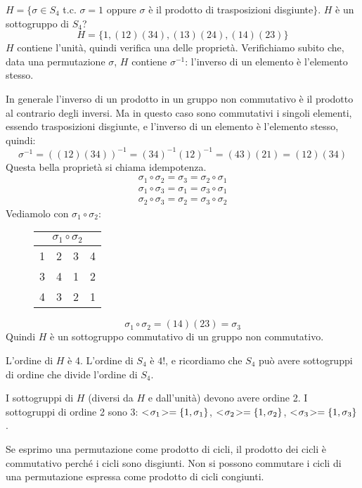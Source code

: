 \begin{exmp}
$H = \{ \sigma \in S_4$ t.c. $\sigma = 1$ oppure $\sigma$ \`e il prodotto di trasposizioni disgiunte$ \}$. $H$ \`e un sottogruppo di $S_4$?
\[
H = \{ 1, (1 2) (3 4), (1 3) (2 4), (1 4) (2 3) \}
\]
$H$ contiene l'unit\`a, quindi verifica una delle propriet\`a. Verifichiamo subito che, data una permutazione $\sigma$, $H$ contiene $\sigma^{-1}$: l'inverso di un elemento \`e l'elemento stesso.

In generale l'inverso di un prodotto in un gruppo non commutativo \`e il prodotto al contrario degli inversi. Ma in questo caso sono commutativi i singoli elementi, essendo trasposizioni disgiunte, e l'inverso di un elemento \`e l'elemento stesso, quindi:
\[
\sigma^{-1} = \left( (1 2) (3 4) \right)^{-1} = (3 4)^{-1} (1 2)^{-1} = (4 3) (2 1) = (1 2) (3 4)
\]
Questa bella propriet\`a si chiama idempotenza.
\begin{gather*}
\sigma_1 \circ \sigma_2 = \sigma_3 = \sigma_2 \circ \sigma_1 \\
\sigma_1 \circ \sigma_3 = \sigma_1 = \sigma_3 \circ \sigma_1 \\
\sigma_2 \circ \sigma_3 = \sigma_2 = \sigma_3 \circ \sigma_2
\end{gather*}
Vediamolo con $\sigma_1 \circ \sigma_2$:
\begin{figure}
\centering
\begin{tabular}{*{4}{c}}
\multicolumn{4}{c}{$\sigma_1 \circ \sigma_2$} \\
\hline
1 & 2 & 3 & 4 \\
3 & 4 & 1 & 2 \\
4 & 3 & 2 & 1
\end{tabular}
\end{figure}
\[
\sigma_1 \circ \sigma_2 = (1 4) (2 3) = \sigma_3
\]
Quindi $H$ \`e un sottogruppo commutativo di un gruppo non commutativo.

L'ordine di $H$ \`e 4. L'ordine di $S_4$ \`e $4!$, e ricordiamo che $S_4$ pu\`o avere sottogruppi di ordine che divide l'ordine di $S_4$.

I sottogruppi di $H$ (diversi da $H$ e dall'unit\`a) devono avere ordine 2. I sottogruppi di ordine 2 sono 3: $<\!{\sigma_1}\!> = \{ 1, \sigma_1\}$, $<\!{\sigma_2}\!> = \{1, \sigma_2\}$, $<\!{\sigma_3}\!> = \{1, \sigma_3 \}$.
\end{exmp}
\begin{oss}
Se esprimo una permutazione come prodotto di cicli, il prodotto dei cicli \`e commutativo perch\'e i cicli sono disgiunti. Non si possono commutare i cicli di una permutazione espressa come prodotto di cicli congiunti.
\end{oss}

